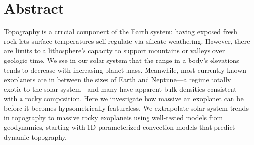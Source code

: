 \section*{Abstract}

Topography is a crucial component of the Earth system: having exposed fresh rock lets surface temperatures self-regulate via silicate weathering. However, there are limits to a lithosphere’s capacity to support mountains or valleys over geologic time. We see in our solar system that the range in a body’s elevations tends to decrease with increasing planet mass. Meanwhile, most currently-known exoplanets are in between the sizes of Earth and Neptune---a regime totally exotic to the solar system---and many have apparent bulk densities consistent with a rocky composition. Here we investigate how massive an exoplanet can be before it becomes hypsometrically featureless. We extrapolate solar system trends in topography to massive rocky exoplanets using well-tested models from geodynamics, starting with 1D parameterized convection models that predict dynamic topography.